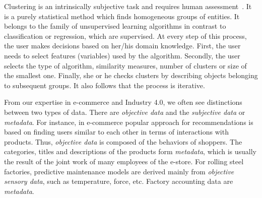 \documentclass[
 twocolumn,
 hf,
]{ceurart}
\begin{document}
Clustering is an intrinsically subjective task and requires human assessment~\cite{10.1145/3340960}.
It is a purely statistical method which finds homogeneous groups of entities.
It belongs to the family of unsupervised learning algorithms in contrast to classification or regression, which are supervised.
At every step of this process, the user makes decisions based on her/his domain knowledge.
First, the user needs to select features (variables) used by the algorithm.
Secondly, the user selects the type of algorithm, similarity measures, number of clusters or size of the smallest one.
Finally, she or he checks clusters by describing objects belonging to subsequent groups.
It also follows that the process is iterative.

From our expertise in e-commerce and Industry 4.0, we often see distinctions between two types of data.
There are \textit{objective data} and the \textit{subjective data} or \textit{metadata}.
For instance, in e-commerce popular approach for recommendations is based on finding users similar to each other in terms of interactions with products.
Thus, \textit{objective data} is composed of the behaviors of shoppers.
The categories, titles and descriptions of the products form \textit{metadata}, which is usually the result of the joint work of many employees of the e-store.
For rolling steel factories, predictive maintenance models are derived mainly from \textit{objective sensory data}, such as temperature, force, etc.
Factory accounting data are \textit{metadata}.
\end{document}
